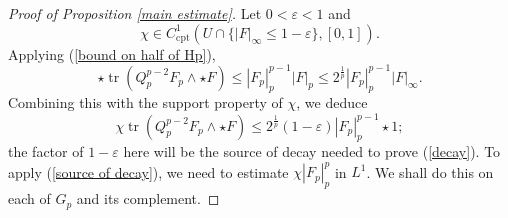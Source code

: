\documentclass[reqno,11pt]{amsart}
\DeclareMathOperator{\tr}{tr}
\newcommand{\cpt}{\mathrm{cpt}}
\theoremstyle{definition}
\numberwithin{equation}{section}
\begin{document}
\begin{proof}[Proof of Proposition \ref{main estimate}]
Let $0 < \varepsilon < 1$ and
$$\chi \in C^1_\cpt(U \cap \{|F|_\infty \leq 1 - \varepsilon\}, [0, 1]).$$
Applying (\ref{bound on half of Hp}),
$$\star \tr(Q_p^{p - 2} F_p \wedge \star F) \leq |F_p|_p^{p - 1} |F|_p \leq 2^{\frac{1}{p}} |F_p|_p^{p - 1} |F|_\infty.$$
Combining this with the support property of $\chi$, we deduce
\begin{equation}\label{source of decay}
\chi \tr(Q_p^{p - 2} F_p \wedge \star F) \leq 2^{\frac{1}{p}} (1 - \varepsilon) |F_p|_p^{p - 1} \star 1;
\end{equation}
the factor of $1 - \varepsilon$ here will be the source of decay needed to prove (\ref{decay}).
To apply (\ref{source of decay}), we need to estimate $\chi |F_p|_p^p$ in $L^1$.
We shall do this on each of $G_p$ and its complement.


\end{proof}
\end{document}

